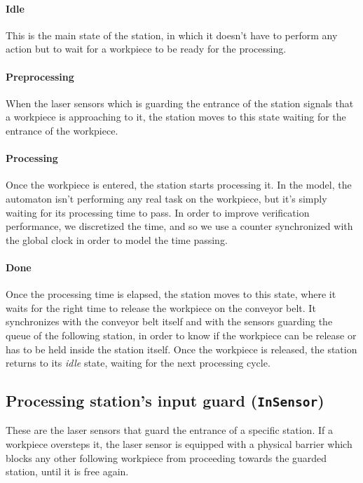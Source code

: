 \documentclass[a4paper,twoside]{article}
\begin{document}
    \paragraph{Idle} This is the main state of the station, in which it doesn't have to perform any action but to wait for a workpiece to be ready for the processing.

    \paragraph{Preprocessing} When the laser sensors which is guarding the entrance of the station signals that a workpiece is approaching to it, the station moves to this state waiting for the entrance of the workpiece.

    \paragraph{Processing} Once the workpiece is entered, the station starts processing it. In the model, the automaton isn't performing any real task on the workpiece, but it's simply waiting for its processing time to pass. In order to improve verification performance, we discretized the time, and so we use a counter synchronized with the global clock in order to model the time passing.

    \paragraph{Done} Once the processing time is elapsed, the station moves to this state, where it waits for the right time to release the workpiece on the conveyor belt. It synchronizes with the conveyor belt itself and with the sensors guarding the queue of the following station, in order to know if the workpiece can be release or has to be held inside the station itself. Once the workpiece is released, the station returns to its \textit{idle} state, waiting for the next processing cycle.

    \subsection{Processing station's input guard (\texttt{InSensor})}

    These are the laser sensors that guard the entrance of a specific station. If a workpiece oversteps it, the laser sensor is equipped with a physical barrier which blocks any other following workpiece from proceeding towards the guarded station, until it is free again.
\end{document}
